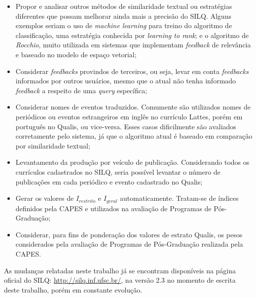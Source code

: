\documentclass[12pt]{article}
\begin{document}
\begin{itemize}

\item Propor e analisar outros métodos de similaridade textual ou estratégias diferentes que possam melhorar ainda mais a precisão do SILQ. Alguns exemplos seriam o uso de \textit{machine learning} para treino do algoritmo de classificação, uma estratégia conhecida por \textit{learning to rank}; e o algoritmo de \textit{Rocchio}, muito utilizada em sistemas que implementam \textit{feedback} de relevância e baseado no modelo de espaço vetorial;

\item Considerar \textit{feedbacks} provindos de terceiros, ou seja, levar em conta \textit{feedbacks} informados por outros usuários, mesmo que o atual não tenha informado \textit{feedback} a respeito de uma \textit{query} específica;

\item Considerar nomes de eventos traduzidos. Comumente são utilizados nomes de periódicos ou eventos estrangeiros em inglês no currículo Lattes, porém em português no Qualis, ou vice-versa. Esses casos dificilmente são avaliados corretamente pelo sistema, já que o algoritmo atual é baseado em comparação por similaridade textual;

\item Levantamento da produção por veículo de publicação. Considerando todos os currículos cadastrados no SILQ, seria possível levantar o número de publicações em cada periódico e evento cadastrado no Qualis;

\item Gerar os valores de $I_{restrito}$ e $I_{geral}$ automaticamente. Tratam-se de índices definidos pela CAPES e utilizados na avaliação de Programas de Pós-Graduação;

\item Considerar, para fins de ponderação dos valores de estrato Qualis, os pesos considerados pela avaliação de Programas de Pós-Graduação realizada pela CAPES.

\end{itemize}

As mudanças relatadas neste trabalho já se encontram disponíveis na página oficial do SILQ: \url{http://silq.inf.ufsc.br/}, na versão 2.3 no momento de escrita deste trabalho, porém em constante evolução.



\end{document}
